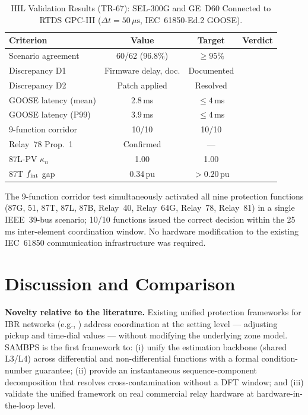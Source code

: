 \documentclass[journal,twoside]{IEEEtran}
\newcommand{\cmark}{\ding{51}}
\begin{document}
\begin{table}[h]
  \centering
  \caption{HIL Validation Results (TR-67): SEL-300G and GE~D60 Connected
    to RTDS GPC-III ($\Delta t = 50\,\mu\text{s}$, IEC~61850-Ed.2 GOOSE).}
  \label{tab:hil}
  \begin{tabular}{@{}p{2.9cm}ccc@{}}
    \toprule
    Criterion & Value & Target & Verdict \\
    \midrule
    Scenario agreement & 60/62 (96.8\%) & $\geq 95\%$ & \cmark \\
    Discrepancy D1 & Firmware delay, doc. & Documented & \cmark \\
    Discrepancy D2 & Patch applied & Resolved & \cmark \\
    GOOSE latency (mean) & 2.8\,ms & $\leq 4$\,ms & \cmark \\
    GOOSE latency (P99) & 3.9\,ms & $\leq 4$\,ms & \cmark \\
    9-function corridor & 10/10 & 10/10 & \cmark \\
    Relay~78 Prop.~1 & Confirmed & --- & \cmark \\
    87L-PV $\kappa_n$ & 1.00 & 1.00 & \cmark \\
    87T $f_{\rm int}$ gap & 0.34\,pu & $> 0.20$\,pu & \cmark \\
    \bottomrule
  \end{tabular}
\end{table}

The 9-function corridor test simultaneously activated all nine protection
functions (87G, 51, 87T, 87L, 87B, Relay~40, Relay~64G, Relay~78, Relay~81) in
a single IEEE~39-bus scenario; 10/10 functions issued the correct decision within
the 25\,ms inter-element coordination window.
No hardware modification to the existing IEC~61850 communication infrastructure
was required.

\section{Discussion and Comparison}
\label{sec:discuss}

\textbf{Novelty relative to the literature.}
Existing unified protection frameworks for IBR networks (e.g.,
\cite{Nikkhajoei2009,Saldarriaga2014}) address coordination at the setting level
--- adjusting pickup and time-dial values --- without modifying the underlying
zone model.
SAMBPS is the first framework to:
(i) unify the estimation backbone (shared L3/L4) across differential and
non-differential functions with a formal condition-number guarantee;
(ii) provide an instantaneous sequence-component decomposition that resolves
cross-contamination without a DFT window; and
(iii) validate the unified framework on real commercial relay hardware at
hardware-in-the-loop level.
\end{document}
